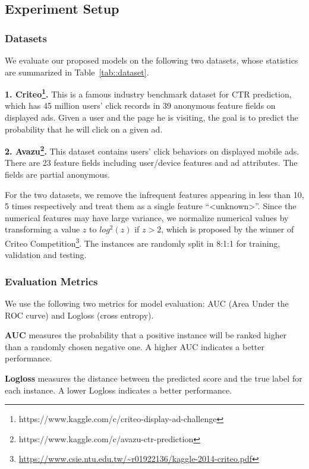 \documentclass[sigconf]{acmart}
\begin{document}
\subsection{Experiment Setup}

\subsubsection{Datasets}
We evaluate our proposed models on the following two datasets, whose statistics are summarized in Table~\ref{tab::dataset}.

\textbf{1. Criteo\footnote{https://www.kaggle.com/c/criteo-display-ad-challenge}.} This is a famous industry benchmark dataset for CTR prediction, which has 45 million users' click records in 39 anonymous feature fields on displayed ads.
Given a user and the page he is visiting, the goal
is to predict the probability that he will click on a given ad.

\textbf{2. Avazu\footnote{https://www.kaggle.com/c/avazu-ctr-prediction}.} This dataset contains users' click behaviors on displayed mobile ads. 
There are 23 feature fields including user/device features and ad attributes.  
The fields are partial anonymous.

For the two datasets, we remove the infrequent features appearing in less than 10, 5 times respectively and treat them as a single feature ``<unknown>''.
Since the numerical features may have large variance, we normalize numerical values by transforming a value $z$ to $log^2(z)$ if $z > 2$, which is proposed by the winner of Criteo Competition\footnote{\url{https://www.csie.ntu.edu.tw/~r01922136/kaggle-2014-criteo.pdf}}. 
The instances are randomly split in 8:1:1 for training, validation and testing. 


\subsubsection{Evaluation Metrics}
We use the following two metrics for model evaluation: AUC (Area Under the ROC curve) and Logloss (cross entropy).

\textbf{AUC} measures the probability that a positive instance will be ranked higher than a randomly chosen negative one.  
A higher AUC indicates a better performance.

\textbf{Logloss} measures the distance between the predicted score and the true label for each instance.
A lower Logloss indicates a better performance.
\end{document}
